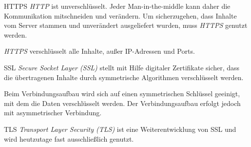 \begin{defi}{HTTPS}
    \emph{HTTP} ist unverschlüsselt.
    Jeder Man-in-the-middle kann daher die Kommunikation mitschneiden und verändern.
    Um sicherzugehen, dass Inhalte vom Server stammen und unverändert ausgeliefert wurden, muss \emph{HTTPS} genutzt werden.

    \emph{HTTPS} verschlüsselt alle Inhalte, außer IP-Adressen und Ports.
\end{defi}

\begin{bonus}{SSL}
    \emph{Secure Socket Layer (SSL)} stellt mit Hilfe digitaler Zertifikate sicher, dass die übertragenen Inhalte durch symmetrische Algorithmen verschlüsselt werden.

    Beim Verbindungsaufbau wird sich auf einen symmetrischen Schlüssel geeinigt, mit dem die Daten verschlüsselt werden.
    Der Verbindungsaufbau erfolgt jedoch mit asymmetrischer Verbindung.
\end{bonus}

\begin{bonus}{TLS}
    \emph{Transport Layer Security (TLS)} ist eine Weiterentwicklung von SSL und wird heutzutage fast ausschließlich genutzt.
\end{bonus}

